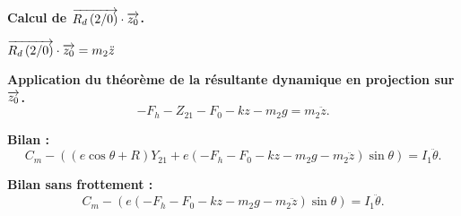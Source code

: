 \documentclass[10pt,fleqn]{article} %
\begin{document}
\textbf{Calcul de $\overrightarrow{R_d \left( {2}/ {0}\right)}\cdot \overrightarrow{z_0}$.}
 
$\overrightarrow{R_d \left( {2}/ {0}\right)}\cdot \overrightarrow{z_0}=m_2\ddot{z}$

\textbf{Application du théorème de la résultante dynamique en projection sur $\overrightarrow{z_0}$.}
$$
-F_h-Z_{21}-F_0-kz-m_2g=m_2\ddot{z}.
$$


\textbf{Bilan :}
$$C_m-\left(\left(e\cos\theta+R\right)Y_{21} +e \left( -F_h-F_0-kz-m_2g-m_2\ddot{z}\right)\sin\theta\right) =I_1\ddot{\theta}.$$

\textbf{Bilan sans frottement :}
$$C_m-\left(e \left( -F_h-F_0-kz-m_2g-m_2\ddot{z}\right)\sin\theta\right) =I_1\ddot{\theta}.$$
\end{document}

